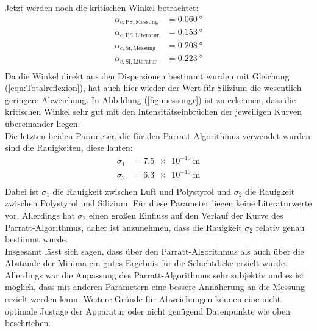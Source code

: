 \noindent Jetzt werden noch die kritischen Winkel betrachtet:
\begin{align*}
  \alpha_\mathrm{c,PS,Messung}&=\SI{0.060}{\degree} \\
  \alpha_\mathrm{c,PS,Literatur}&=\SI{0.153}{\degree} \\
  \alpha_\mathrm{c,Si,Messung}&=\SI{0.208}{\degree} \\
  \alpha_\mathrm{c,Si,Literatur}&=\SI{0.223}{\degree} \\
\end{align*}
Da die Winkel direkt aus den Dispersionen bestimmt wurden mit Gleichung (\ref{eqn:Totalreflexion}), hat auch hier wieder der Wert für Silizium die wesentlich geringere Abweichung.
In Abbildung (\ref{fig:messungr}) ist zu erkennen, dass die kritischen Winkel sehr gut mit den Intensitätseinbrüchen der jeweiligen Kurven übereinander liegen. \\

\noindent Die letzten beiden Parameter, die für den Parratt-Algorithmus verwendet wurden sind die Rauigkeiten, diese lauten:
\begin{align*}
  \sigma_\mathrm{1} &=\SI{7.5 e-10}{\meter} \\
  \sigma_\mathrm{2} &=\SI{6.3 e-10}{\meter} \\
\end{align*}
Dabei ist $\sigma_\mathrm{1}$ die Rauigkeit zwischen Luft und Polystyrol und $\sigma_\mathrm{2}$ die Rauigkeit zwischen Polystyrol und Silizium. Für diese Parameter liegen
keine Literaturwerte vor. Allerdings hat $\sigma_\mathrm{2}$ einen großen Einfluss auf den Verlauf der Kurve des Parratt-Algorithmus, daher ist anzunehmen, dass die
Rauigkeit $\sigma_\mathrm{2}$ relativ genau bestimmt wurde.\\

\noindent Insgesamt lässt sich sagen, dass über den Parratt-Algorithmus als auch über die Abstände der Minima ein gutes Ergebnis für die Schichtdicke erzielt wurde. Allerdings
war die Anpassung des Parratt-Algorithmus sehr subjektiv und es ist möglich, dass mit anderen Parametern eine bessere Annäherung an die Messung erzielt werden kann.
Weitere Gründe für Abweichungen können eine nicht optimale Justage der Apparatur oder nicht genügend Datenpunkte wie oben beschrieben.

